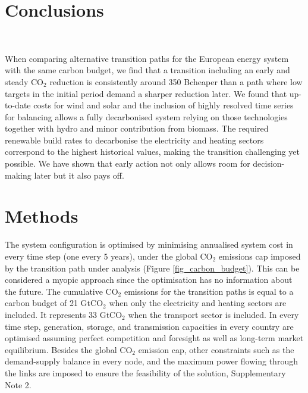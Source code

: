 \documentclass[5p]{elsarticle} %
\begin{document}
\section{Conclusions} \

When comparing alternative transition paths for the European energy system with the same carbon budget, we find that a transition including an early and steady CO$_2$ reduction is consistently around 350 B\EUR cheaper than a path where low targets in the initial period demand a sharper reduction later.  We found that up-to-date costs for wind and solar and the inclusion of highly resolved time series for balancing allows a fully decarbonised system relying on those technologies together with hydro and minor contribution from biomass. The required renewable build rates to decarbonise the electricity and heating sectors correspond to the highest historical values, making the transition challenging yet possible. We have shown that early action not only allows room for decision-making later but it also pays off. 



\FloatBarrier
\section{Methods}

The system configuration is optimised by minimising annualised system cost in every time step (one every 5 years), under the global CO$_2$ emissions cap imposed by the transition path under analysis (Figure \ref{fig_carbon_budget}). This can be considered a myopic approach since the optimisation has no information about the future. The cumulative CO$_2$ emissions for the transition paths is equal to a carbon budget of 21 GtCO$_2$ when only the electricity and heating sectors are included. It represents 33 GtCO$_2$ when the transport sector is included. In every time step, generation, storage, and transmission capacities in every country are optimised assuming perfect competition and foresight as well as long-term market equilibrium. Besides the global CO$_2$ emission cap, other constraints such as the demand-supply balance in every node, and the maximum power flowing through the links are imposed to ensure the feasibility of the solution, Supplementary Note 2. \
\end{document}
